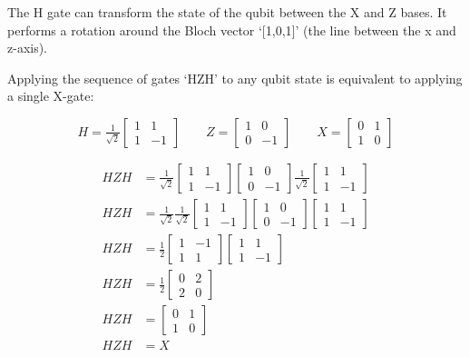 The H gate can transform the state of the qubit between the X and Z bases. It performs a rotation around the Bloch vector `[1,0,1]' (the line between the x and z-axis).

Applying the sequence of gates `HZH' to any qubit state is equivalent to applying a single X-gate:

$$ H = \tfrac{1}{\sqrt{2}}\begin{bmatrix} 1 & 1 \\ 1 & -1 \end{bmatrix} \quad\quad  Z = \begin{bmatrix} 1 & 0 \\ 0 & -1 \end{bmatrix} \quad\quad  X = \begin{bmatrix} 0 & 1 \\ 1 & 0 \end{bmatrix} $$

\begin{equation*} 
\begin{split}
HZH & = \tfrac{1}{\sqrt{2}}\begin{bmatrix} 1 & 1 \\ 1 & -1 \end{bmatrix} \begin{bmatrix} 1 & 0 \\ 0 & -1 \end{bmatrix}\tfrac{1}{\sqrt{2}}\begin{bmatrix} 1 & 1 \\ 1 & -1 \end{bmatrix} \\
HZH & = \tfrac{1}{\sqrt{2}}\tfrac{1}{\sqrt{2}}\begin{bmatrix} 1 & 1 \\ 1 & -1 \end{bmatrix} \begin{bmatrix} 1 & 0 \\ 0 & -1 \end{bmatrix}\begin{bmatrix} 1 & 1 \\ 1 & -1 \end{bmatrix} \\
HZH & = \tfrac{1}{2}\begin{bmatrix} 1 & -1 \\ 1 & 1 \end{bmatrix}\begin{bmatrix} 1 & 1 \\ 1 & -1 \end{bmatrix}\\
HZH & = \tfrac{1}{2}\begin{bmatrix} 0 & 2 \\ 2 & 0 \end{bmatrix} \\
HZH & = \begin{bmatrix} 0 & 1 \\ 1 & 0 \end{bmatrix} \\
HZH & = X
\end{split}
\end{equation*}


